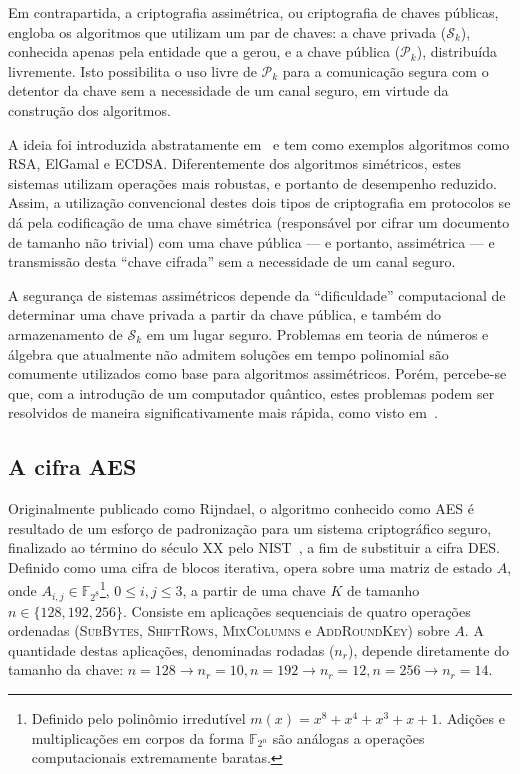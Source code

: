 \documentclass{ufsctex/ufsctex}
\newcommand{\pk}{\mathcal{P}_k}
\newcommand{\sk}{\mathcal{S}_k}
\begin{document}
Em contrapartida, a criptografia assimétrica, ou criptografia de chaves
públicas, engloba os algoritmos que utilizam um par de chaves: a chave privada
($\sk{}$), conhecida apenas pela entidade que a gerou, e a chave pública
($\pk{}$), distribuída livremente. Isto possibilita o uso livre de $\pk{}$ para
a comunicação segura com o detentor da chave sem a necessidade de um canal
seguro, em virtude da construção dos algoritmos.

A ideia foi introduzida abstratamente em~\cite{Diffie:2006:NDC:2263321.2269104}
e tem como exemplos algoritmos como RSA, ElGamal e
ECDSA.
Diferentemente dos algoritmos simétricos, estes sistemas utilizam operações
mais robustas, e portanto de desempenho reduzido. Assim, a utilização
convencional destes dois tipos de criptografia em protocolos se dá pela
codificação de uma chave simétrica (responsável por cifrar um documento de
tamanho não trivial) com uma chave pública --- e portanto, assimétrica --- e
transmissão desta ``chave cifrada'' sem a necessidade de um canal seguro.

A segurança de sistemas assimétricos depende da ``dificuldade'' computacional
de determinar uma chave privada a partir da chave pública, e também do
armazenamento de $\sk{}$ em um lugar seguro. Problemas em teoria de números e
álgebra que atualmente não admitem soluções em tempo polinomial são comumente
utilizados como base para algoritmos assimétricos.  Porém, percebe-se que, com
a introdução de um computador quântico, estes problemas podem ser resolvidos de
maneira significativamente mais rápida, como visto
em~\cite{Shor:1997:PAP:264393.264406}.

\subsection{A cifra AES}\label{subsection:aes}

Originalmente publicado como Rijndael, o algoritmo conhecido como
AES é resultado de um esforço
de padronização para um sistema criptográfico seguro, finalizado ao término do
século XX pelo NIST~\cite{Standards2001}, a fim de substituir a cifra
DES. Definido como uma cifra de
blocos iterativa, opera sobre uma matriz de estado $A$, onde $A_{i,j} \in
\mathbb{F}_{2^{8}}$\footnote{Definido pelo polinômio irredutível $m(x) = x^{8} + x^{4} + x^{3}
+ x + 1$. Adições e multiplicações em corpos da forma $\mathbb{F}_{2^n}$ são
análogas a operações computacionais extremamente baratas.}, $0 \leq i, j \leq
3$, a partir de uma chave $K$ de tamanho $n \in \{128, 192, 256\}$. Consiste em
aplicações sequenciais de quatro operações ordenadas (\textsc{SubBytes},
\textsc{ShiftRows}, \textsc{MixColumns} e \textsc{AddRoundKey}) sobre $A$. A
quantidade destas aplicações, denominadas rodadas ($n_r$), depende diretamente
do tamanho da chave: $n = 128 \rightarrow n_r = 10, n = 192 \rightarrow n_r =
12, n = 256 \rightarrow n_r = 14$.
\end{document}
